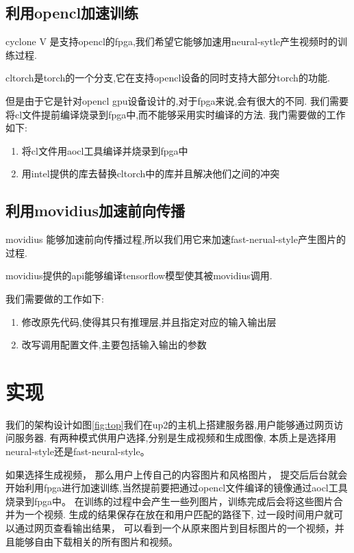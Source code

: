 \subsection{利用opencl加速训练}
cyclone V 是支持opencl的fpga,我们希望它能够加速用neural-sytle产生视频时的训练过程.

cltorch是torch的一个分支,它在支持opencl设备的同时支持大部分torch的功能.

但是由于它是针对opencl gpu设备设计的,对于fpga来说,会有很大的不同.
我们需要将cl文件提前编译烧录到fpga中,而不能够采用实时编译的方法.
我门需要做的工作如下:
\begin{enumerate}
  \item 将cl文件用aocl工具编译并烧录到fpga中
  \item 用intel提供的库去替换cltorch中的库并且解决他们之间的冲突
\end{enumerate}

\subsection{利用movidius加速前向传播}
movidius 能够加速前向传播过程,所以我们用它来加速fast-nerual-style产生图片的过程.

movidius提供的api能够编译tensorflow模型使其被movidius调用.

我们需要做的工作如下:
\begin{enumerate}
  \item 修改原先代码,使得其只有推理层,并且指定对应的输入输出层
  \item 改写调用配置文件,主要包括输入输出的参数
\end{enumerate}

\section{实现}	

我们的架构设计如图\ref{fig:top}我们在up2的主机上搭建服务器,用户能够通过网页访问服务器. 
有两种模式供用户选择,分别是生成视频和生成图像, 本质上是选择用neural-style还是fast-neural-style。

如果选择生成视频， 那么用户上传自己的内容图片和风格图片，
提交后后台就会开始利用fpga进行加速训练,当然提前要把通过opencl文件编译的镜像通过aocl工具烧录到fpga中。
在训练的过程中会产生一些列图片，训练完成后会将这些图片合并为一个视频.
生成的结果保存在放在和用户匹配的路径下, 过一段时间用户就可以通过网页查看输出结果，
可以看到一个从原来图片到目标图片的一个视频，并且能够自由下载相关的所有图片和视频。

